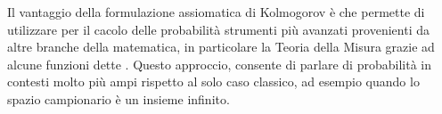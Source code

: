 \documentclass{article}     %
\begin{document}
\begin{oss}[$\curvearrowright$]
    Il vantaggio della formulazione assiomatica di Kolmogorov è che permette di utilizzare per il cacolo delle probabilità strumenti più avanzati provenienti da altre branche della matematica, in particolare la Teoria della Misura grazie ad alcune funzioni dette . Questo approccio, consente di parlare di probabilità in contesti molto più ampi rispetto al solo caso classico, ad esempio quando lo spazio campionario è un insieme infinito.
\end{oss}
                    
 
\end{document}
